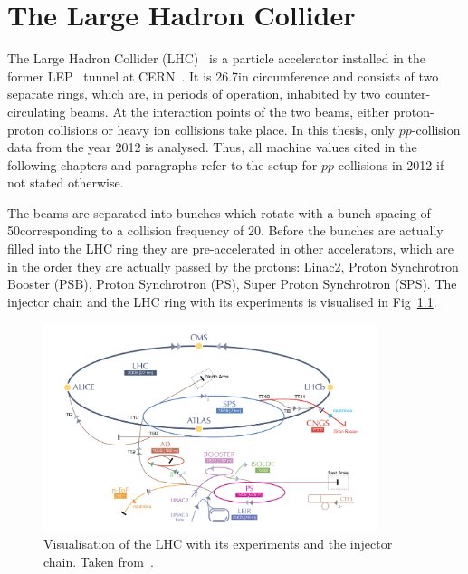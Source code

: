 \chapter{The Large Hadron Collider}

The Large Hadron Collider (LHC)~\cite{bib:LHC_machine_2008,bib:LHC_2004} is a particle accelerator installed in the former LEP~\cite{bib:LEP_design_1984} tunnel at CERN~\cite{bib:CERN:web}.
It is 26.7\km in circumference and consists of two separate rings, which are, in periods of operation, inhabited by two counter-circulating beams.
At the interaction points of the two beams, either proton-proton collisions or heavy ion collisions take place.
In this thesis, only $pp$-collision data from the year 2012 is analysed.
Thus, all machine values cited in the following chapters and paragraphs refer to the setup for $pp$-collisions in 2012 if not stated otherwise.

The beams are separated into bunches which rotate with a bunch spacing of 50\ns corresponding to a collision frequency of 20\mhz.
Before the bunches are actually filled into the LHC ring they are pre-accelerated in other accelerators, which are in the order they are actually passed by the protons: Linac2, Proton  Synchrotron Booster (PSB), Proton Synchrotron (PS), Super Proton Synchrotron (SPS).
The injector chain and the LHC ring with its experiments is visualised in Fig~\ref{fig:LHC}.
\begin{figure}[!b]
  \centering
      \includegraphics[width=0.87\textwidth]{figures/experiment/LHC/LHC_small.png}
  \caption{Visualisation of the LHC with its experiments and the injector chain. Taken from~\cite{bib:CERNBrochure}.}  
  \label{fig:LHC}
\end{figure}

